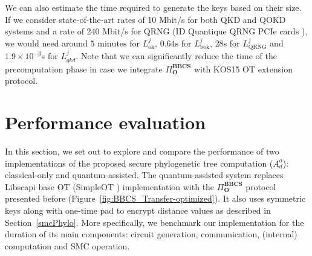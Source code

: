 We can also estimate the time required to generate the keys based on their size. If we consider state-of-the-art rates of 10 Mbit/s for both QKD and QOKD systems \cite{YPT18} and a rate of 240 Mbit/s for QRNG (ID Quantique QRNG PCIe cards \cite{IDQ}), we would need around $5\text{ minutes}$ for $L^j_{\text{ok}}$, $0.64\text{s}$ for $L^j_{\text{bok}}$, $28$s for $L^j_{\text{QRNG}}$ and $1.9\times 10^{-3}$s for $L^{j}_{qkd}$. Note that we can significantly reduce the time of the precomputation phase in case we integrate $\Pi^{\textbf{BBCS}}_{\textbf{O}}$ with KOS15 OT extension protocol. 

%



\section{Performance evaluation}\label{perfEvaluation}

In this section, we set out to explore and compare the performance of two implementations of the proposed secure phylogenetic tree computation ($A^a_d$): classical-only and quantum-assisted. The quantum-assisted system replaces Libscapi base OT (SimpleOT \cite{C15}) implementation with the $\Pi^{\textbf{BBCS}}_{\textbf{O}}$ protocol presented before (Figure~\ref{fig:BBCS_Transfer-optimized}). It also uses symmetric keys along with one-time pad to encrypt distance values as described in Section~\ref{smcPhylo}. More specifically, we benchmark our implementation for the duration of its main components: circuit generation, communication, (internal) computation and SMC operation.

